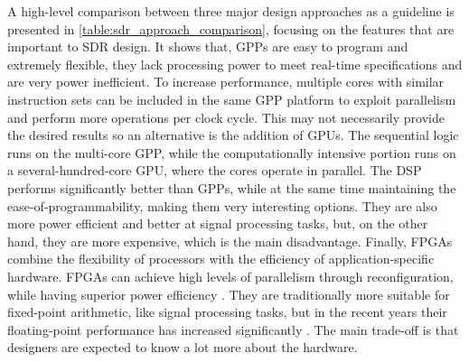 A high-level comparison between three major design approaches as a guideline is presented in \autoref{table:sdr_approach_comparison}, focusing on the features that are important to SDR design. It shows that, GPPs are easy to program and extremely flexible, they lack processing power to meet real-time specifications and are very power inefficient. To increase performance, multiple cores with similar instruction sets can be included in the same GPP platform to exploit parallelism and perform more operations per clock cycle. This may not necessarily provide the desired results so an alternative is the addition of GPUs. The sequential logic runs on the multi-core GPP, while the computationally intensive portion runs on a several-hundred-core GPU, where the cores operate in parallel. The DSP performs significantly better than GPPs, while at the same time maintaining the ease-of-programmability, making them very interesting options. They are also more power efficient and better at signal processing tasks, but, on the other hand, they are more expensive, which is the main disadvantage. Finally, FPGAs combine the flexibility of processors with the efficiency of application-specific hardware. FPGAs can achieve high levels of parallelism through reconfiguration, while having superior power efficiency \cite{v2014a}. They are traditionally more suitable for fixed-point arithmetic, like signal processing tasks, but in the recent years their floating-point performance has increased significantly \cite{kestur2010a} \cite{underwood2004a}. The main trade-off is that designers are expected to know a lot more about the hardware.

